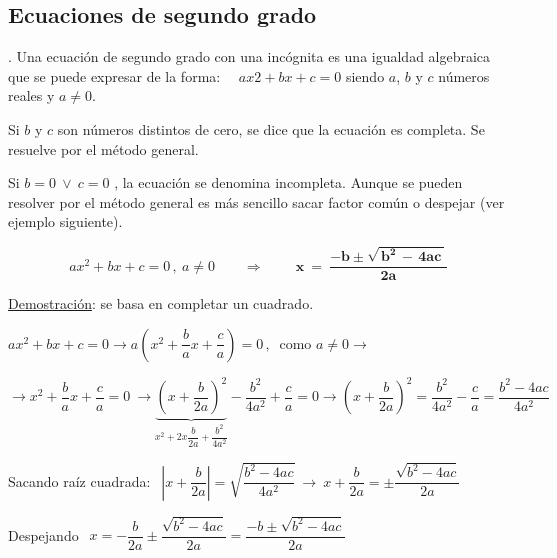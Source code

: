 \vspace{5mm}
\subsection{Ecuaciones de segundo grado}
\vspace{0.5cm}

\begin{definition}
. Una ecuación de segundo grado con una incógnita es una igualdad algebraica que se puede expresar de la forma: $\quad ax2 + bx + c = 0 $                     siendo $a$, $b$ y $c$ números reales y  $a \neq 0$.
\end{definition}


Si  $b$ y $c$  son números distintos de cero, se dice que la ecuación es completa. Se resuelve por el método general.

Si  $b = 0  \ \vee \   c = 0$ , la ecuación se denomina incompleta. Aunque se pueden resolver por el método general es más sencillo sacar factor común o despejar (ver ejemplo siguiente).


\begin{theorem}

$$ax^2+bx+c=0\, , \ a\neq 0 \qquad \Rightarrow \qquad 
\boxed{ \ \boldsymbol{ x\ =\ \dfrac{-b\pm \sqrt{\, b^2\, -\, 4ac \, }}{2a} } \ }$$	
\end{theorem}

\underline{Demostración}: se basa en completar un cuadrado.

$ax^2+bx+c=0 \to a\left(x^2+\dfrac b a x+\dfrac c a \right)=0\, , \  $ como $a\neq 0 \to$

$\to x^2+\dfrac b a x+\dfrac c a=0 \ \to \underbrace{\left( x+\dfrac{b}{2a} \right)^2 }_{x^2+2x\dfrac{b}{2a}+\dfrac{b^2}{4a^2}}-\dfrac{b^2}{4a^2}+\dfrac c a = 0 \to \left( x+\dfrac {b}{2a} \right)^2 = \dfrac{b^2}{4a^2}-\dfrac{c}{a} = \dfrac{b^2-4ac}{4a^2}$ 

Sacando raíz cuadrada: $\ \ \left| x+\dfrac {b}{2a}\right|=\sqrt{ \dfrac{b^2-4ac}{4a^2} } \ \to \ x+\dfrac {b}{2a}=\pm \dfrac{\sqrt{ b^2-4ac }}{2a} $

Despejando $\ \ x=-\dfrac{b}{2a}\pm \dfrac{\sqrt{ b^2-4ac }}{2a}=\dfrac{-b\pm \sqrt{b^2-4ac}}{2a}$ \QED

